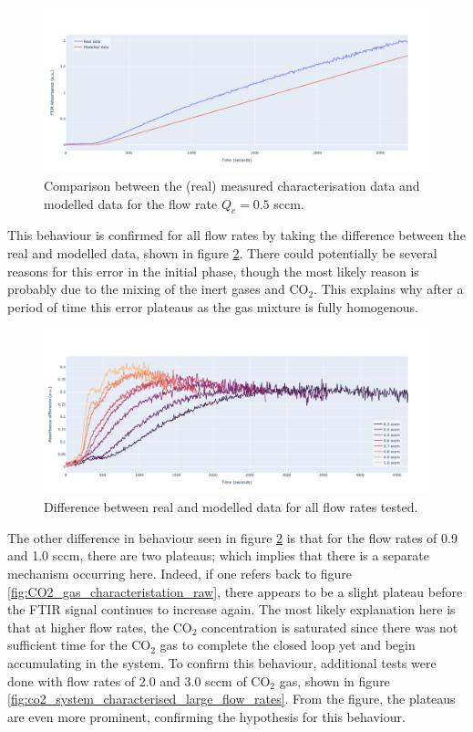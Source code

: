 \begin{figure}[h!]
	\centering
	\includegraphics[width=\linewidth]{chapter_5/figures/real_vs_modelled_data.png}
	\caption{Comparison between the (real) measured characterisation data and modelled data for the flow rate $Q_c = 0.5$ sccm.}
	\label{fig:real_vs_modelled_data}
\end{figure}

This behaviour is confirmed for all flow rates by taking the difference between the real and modelled data, shown in figure \ref{fig:difference_between_real_vs_modelled_data}. There could potentially be several reasons for this error in the initial phase, though the most likely reason is probably due to the mixing of the inert gases and CO$_2$. This explains why after a period of time this error plateaus as the gas mixture is fully homogenous.

\begin{figure}[h!]
	\centering
	\includegraphics[width=\linewidth]{chapter_5/figures/difference_between_real_vs_modelled_data.png}
	\caption{Difference between real and modelled data for all flow rates tested.}
	\label{fig:difference_between_real_vs_modelled_data}
\end{figure}

The other difference in behaviour seen in figure \ref{fig:difference_between_real_vs_modelled_data} is that for the flow rates of 0.9 and 1.0 sccm, there are two plateaus; which implies that there is a separate mechanism occurring here. Indeed, if one refers back to figure \ref{fig:CO2_gas_characteristation_raw}, there appears to be a slight plateau before the FTIR signal continues to increase again. The most likely explanation here is that at higher   flow rates, the CO$_2$ concentration is saturated since there was not sufficient time for the CO$_2$ gas to complete the closed loop yet and begin accumulating in the system. To confirm this behaviour, additional tests were done with flow rates of 2.0 and 3.0 sccm of CO$_2$ gas, shown in figure \ref{fig:co2_system_characterised_large_flow_rates}. From the figure, the plateaus are even more prominent, confirming the hypothesis for this behaviour.

